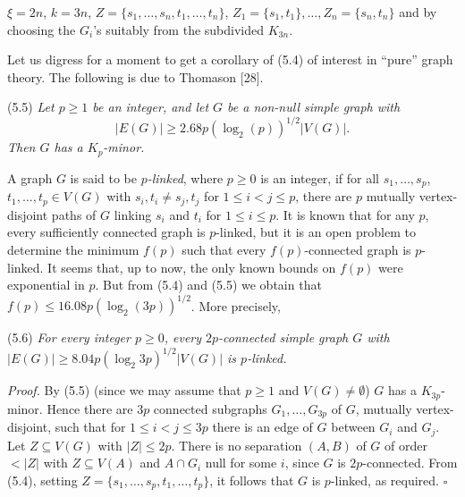 \noindent $\xi = 2n$, $k = 3n$, $Z = \{s_1, \dots, s_n, t_1, \dots, t_n\}$, $Z_1 = \{s_1, t_1\}, \dots, Z_n = \{s_n, t_n\}$ and by choosing the $G_i$'s suitably from the subdivided $K_{3n}$.

Let us digress for a moment to get a corollary of (5.4) of interest in ``pure'' graph theory. The following is due to Thomason [28].

\stmt
(5.5) \textit{Let $p \ge 1$ be an integer, and let $G$ be a non-null simple graph with}
\begin{equation*}
|E(G)| \ge 2.68 p(\log_2(p))^{1/2} |V(G)|.
\end{equation*}
\textit{Then $G$ has a $K_p$-minor.}

A graph $G$ is said to be \textit{$p$-linked}, where $p \ge 0$ is an integer, if for all $s_1, \dots, s_p$, $t_1, \dots, t_p \in V(G)$ with $s_i, t_i \ne s_j, t_j$ for $1 \le i < j \le p$, there are $p$ mutually vertex-disjoint paths of $G$ linking $s_i$ and $t_i$ for $1 \le i \le p$. It is known that for any $p$, every sufficiently connected graph is $p$-linked, but it is an open problem to determine the minimum $f(p)$ such that every $f(p)$-connected graph is $p$-linked. It seems that, up to now, the only known bounds on $f(p)$ were exponential in $p$. But from (5.4) and (5.5) we obtain that $f(p) \le 16.08 p (\log_2 (3p))^{1/2}$. More precisely,

\stmt
(5.6) \textit{For every integer $p \ge 0$, every $2p$-connected simple graph $G$ with $|E(G)| \ge 8.04 p(\log_2 3p)^{1/2} |V(G)|$ is $p$-linked.}

\textit{Proof.} By (5.5) (since we may assume that $p \ge 1$ and $V(G) \ne \emptyset$) $G$ has a $K_{3p}$-minor. Hence there are $3p$ connected subgraphs $G_1, \dots, G_{3p}$ of $G$, mutually vertex-disjoint, such that for $1 \le i < j \le 3p$ there is an edge of $G$ between $G_i$ and $G_j$. Let $Z \subseteq V(G)$ with $|Z| \le 2p$. There is no separation $(A, B)$ of $G$ of order $< |Z|$ with $Z \subseteq V(A)$ and $A \cap G_i$ null for some $i$, since $G$ is $2p$-connected. From (5.4), setting $Z = \{s_1, \dots, s_p, t_1, \dots, t_p\}$, it follows that $G$ is $p$-linked, as required. $\square$

